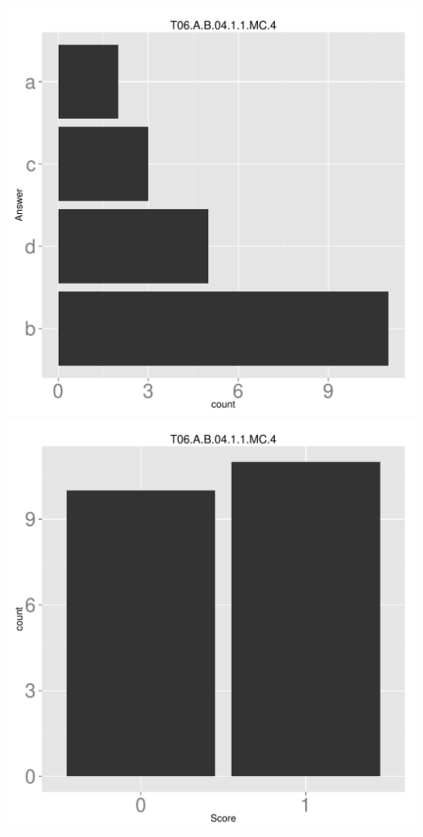 \documentclass[12pt,nohyper]{tufte-handout}\usepackage[]{graphicx}\usepackage[]{color}
\begin{document}
\begin{center} \includegraphics[width=.45\linewidth]{Topic06_8_answer} \includegraphics[width=.45\linewidth]{Topic06_8_score} \end{center} 
\end{document}
